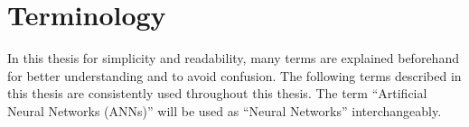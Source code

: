 \section{Terminology}\label{terminology}

In this thesis for simplicity and readability, many terms are explained beforehand for better understanding and to avoid confusion. The following terms described in this thesis are consistently used throughout this thesis. The term ``Artificial Neural Networks (\acp{ANN})'' will be used as ``Neural Networks'' interchangeably. 

